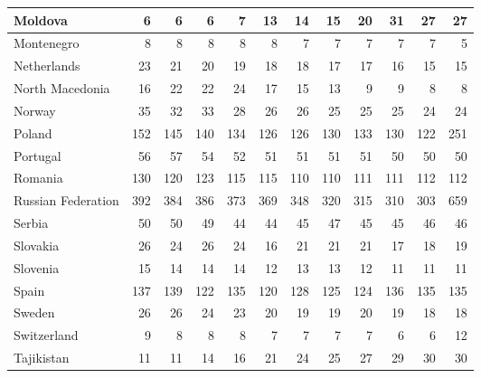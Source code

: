 \begin{table}
\begin{tabular}{|l|r|r|r|r|r|r|r|r|r|r|r|}
                       Moldova&      6&      6&      6&      7&     13&     14&     15&     20&     31&     27&     27\\\hline
                    Montenegro&      8&      8&      8&      8&      8&      7&      7&      7&      7&      7&      5\\\hline
                   Netherlands&     23&     21&     20&     19&     18&     18&     17&     17&     16&     15&     15\\\hline
               North Macedonia&     16&     22&     22&     24&     17&     15&     13&      9&      9&      8&      8\\\hline
                        Norway&     35&     32&     33&     28&     26&     26&     25&     25&     25&     24&     24\\\hline
                        Poland&    152&    145&    140&    134&    126&    126&    130&    133&    130&    122&    251\\\hline
                      Portugal&     56&     57&     54&     52&     51&     51&     51&     51&     50&     50&     50\\\hline
                       Romania&    130&    120&    123&    115&    115&    110&    110&    111&    111&    112&    112\\\hline
            Russian Federation&    392&    384&    386&    373&    369&    348&    320&    315&    310&    303&    659\\\hline
                        Serbia&     50&     50&     49&     44&     44&     45&     47&     45&     45&     46&     46\\\hline
                      Slovakia&     26&     24&     26&     24&     16&     21&     21&     21&     17&     18&     19\\\hline
                      Slovenia&     15&     14&     14&     14&     12&     13&     13&     12&     11&     11&     11\\\hline
                         Spain&    137&    139&    122&    135&    120&    128&    125&    124&    136&    135&    135\\\hline
                        Sweden&     26&     26&     24&     23&     20&     19&     19&     20&     19&     18&     18\\\hline
                   Switzerland&      9&      8&      8&      8&      7&      7&      7&      7&      6&      6&     12\\\hline
                    Tajikistan&     11&     11&     14&     16&     21&     24&     25&     27&     29&     30&     30\\\hline

\end{tabular}
\end{table}
